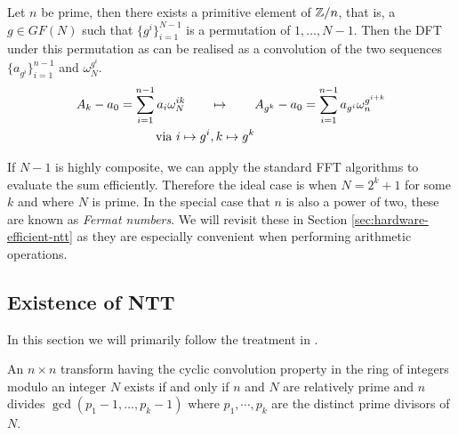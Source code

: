 \begin{definition}\label{thm:rader-transform}
    Let $n$ be prime, then there exists a primitive element of ${\mathbb Z}/n$, that is, a $g \in GF(N)$ such that $\{g^i\}_{i=1}^{N-1}$ is a permutation of $1, \ldots, N-1$. Then the DFT under this permutation as can be realised as a convolution of the two sequences $\{a_{g^i}\}_{i=1}^{n-1}$ and $\omega_N^{g^i}$.
    \begin{align*}
        A_k - a_0 = \sum^{n-1}_{i=1} a_i \omega_N^{ik} \qquad &\mapsto \qquad A_{g^k} - a_0 = \sum^{n-1}_{i=1} a_{g^i}\omega_n^{g^{i+k}}\\
        \textrm{ via } i \mapsto g^i&, k \mapsto g^k
    \end{align*}
\end{definition}

If $N - 1$ is highly composite, we can apply the standard FFT algorithms to evaluate the sum efficiently. Therefore the ideal case is when $N = 2^k + 1$ for some $k$ and where $N$ is prime. In the special case that $n$ is also a power of two, these are known as \emph{Fermat numbers}. We will revisit these in Section \ref{sec:hardware-efficient-ntt} as they are especially convenient when performing arithmetic operations.

\subsection{Existence of NTT}%
\label{sub:Existence of NTT}

In this section we will primarily follow the treatment in \cite{intro-to-fmt}.

\begin{theorem}\label{thm:fmt-transform-length}
    An $n \times n$ transform having the cyclic convolution property in the ring of integers modulo an integer $N$ exists if and only if $n$ and $N$ are relatively prime and $n$ divides $\gcd(p_1 - 1, \ldots, p_k - 1)$ where $p_1, \cdots, p_k$ are the distinct prime divisors of $N$.
\end{theorem}

